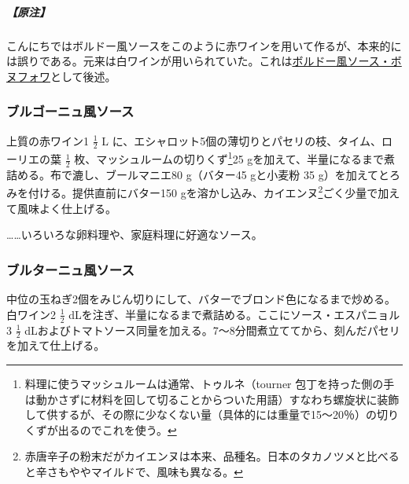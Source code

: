 \begin{recette}
\hypertarget{nota-sauce-bordelaise}{%
\subparagraph{【原注】}\label{nota-sauce-bordelaise}}

こんにちではボルドー風ソースをこのように赤ワインを用いて作るが、本来的には誤りである。元来は白ワインが用いられていた。これは\protect\hyperlink{sauce-bonnefoy}{ボルドー風ソース・ボヌフォワ}として後述。

\hypertarget{sauce-bourguignonne}{%
\subsubsection{ブルゴーニュ風ソース}\label{sauce-bourguignonne}}



上質の赤ワイン1 \(\frac{1}{2}\) L
に、エシャロット5個の薄切りとパセリの枝、タイム、ローリエの葉
\(\frac{1}{2}\) 枚、マッシュルームの切りくず\footnote{料理に使うマッシュルームは通常、トゥルネ（tourner
  包丁を持った側の手は動かさずに材料を回して切ることからついた用語）すなわち螺旋状に装飾して供するが、その際に少なくない量（具体的には重量で15〜20％）の切りくずが出るのでこれを使う。}25
gを加えて、半量になるまで煮詰める。布で漉し、ブールマニエ80 g（バター45
gと小麦粉 35 g）を加えてとろみを付ける。提供直前にバター150
gを溶かし込み、カイエンヌ\footnote{赤唐辛子の粉末だがカイエンヌは本来、品種名。日本のタカノツメと比べると辛さもややマイルドで、風味も異なる。}ごく少量で加えて風味よく仕上げる。

\ldots{}\ldots{}いろいろな卵料理や、家庭料理に好適なソース。

\hypertarget{sauce-bretonne}{%
\subsubsection{ブルターニュ風ソース}\label{sauce-bretonne}}



中位の玉ねぎ2個をみじん切りにして、バターでブロンド色になるまで炒める。白ワイン2
\(\frac{1}{2}\)
dLを注ぎ、半量になるまで煮詰める。ここにソース・エスパニョル3
\(\frac{1}{2}\)
dLおよびトマトソース同量を加える。7〜8分間煮立ててから、刻んだパセリを加えて仕上げる。


\end{recette}
